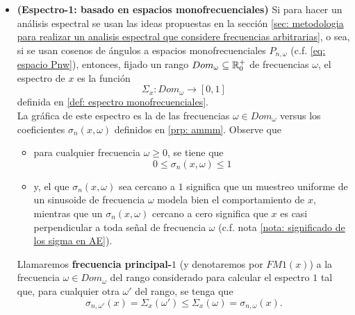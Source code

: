 \begin{itemize}
	\item \textbf{(Espectro-1: basado en espacios monofrecuenciales)} 
	Si para hacer un análisis espectral se usan
	las ideas propuestas en 
	la sección
	\ref{sec: metodologia para realizar un analisis espectral que considere frecuencias arbitrarias}, 
	o sea, si se usan cosenos de ángulos a
	espacios monofrecuenciales $P_{n, \omega}$
	(c.f. \ref{eq: espacio Pnw}),	
	entonces, fijado un rango
	$Dom_{\omega} \subseteq \mathbb{R}^{+}_{0}$	
	de frecuencias $\omega$,
	el espectro de $x$ es 
	la función 
	\[
	\Sigma_{x} : Dom_{\omega} \longrightarrow [0,1]
	\]
	definida en \eqref{def: espectro monofrecuenciales}. \\
	
	La gráfica de este espectro es la de 
	las frecuencias $\omega \in Dom_{\omega}$ versus	
	los coeficientes
	$\sigma_{n}(x, \omega)$ definidos en 
	\ref{prp: ammm}. Observe que
	\begin{itemize}
		\item para cualquier frecuencia $\omega \geq 0$, se tiene que
		\[
		0 \leq \sigma_{n}(x, \omega) \leq 1
		\]
		\item 
	y, el que
	$\sigma_{n}(x, \omega)$ sea cercano a $1$ significa que un
	muestreo uniforme de un sinusoide de frecuencia $\omega$
	modela bien el comportamiento de $x$,
	mientras que un $\sigma_{n}(x, \omega)$ cercano
	a cero significa que 
	$x$ es casi perpendicular a toda señal de frecuencia $\omega$
	(c.f. nota \ref{nota: significado de los sigma en AE}).
	\end{itemize}
	\begin{defi}
	\label{def: FM1}
	Llamaremos \textbf{frecuencia principal-$1$}
	(y denotaremos
	por $FM1(x)$) a la frecuencia $\omega \in Dom_{\omega}$ 
	del rango considerado para calcular el espectro $1$
	tal que, para cualquier otra $\omega'$ del rango, se tenga que
	\[
	\sigma_{n, \omega'}(x) = \Sigma_{x}(\omega') 
	\leq \Sigma_{x}(\omega) = \sigma_{n, \omega}(x).
	\]
	\end{defi}
\end{itemize}



